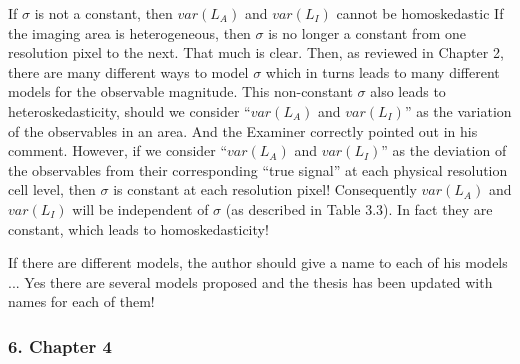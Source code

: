 \replyToComment
    {If $\sigma$ is not a constant, then $var(L_A)$ and $var(L_I)$ cannot be homoskedastic}
    {If the imaging area is heterogeneous, then $\sigma$ is no longer a constant from one resolution pixel to the next.
That much is clear.
Then, as reviewed in Chapter 2, there are many different ways to model $\sigma$ which in turns leads to many different models for the observable magnitude.
This non-constant $\sigma$ also leads to heteroskedasticity, 
  should we consider ``$var(L_A)$ and $var(L_I)$'' as the variation of the observables in an area.
And the Examiner correctly pointed out in his comment. 
However, if we consider ``$var(L_A)$ and $var(L_I)$'' as the deviation of the observables from their corresponding ``true signal'' at each physical resolution cell level, 
  then $\sigma$ is constant at each resolution pixel!
Consequently $var(L_A)$ and $var(L_I)$ will be independent of $\sigma$ (as described in Table 3.3).
In fact they are constant, which leads to homoskedasticity!
}

\replyToComment
    {If there are different models, the author should give a name to each of his models ...}
    {Yes there are several models proposed and the thesis has been updated with names for each of them!}

\subsubsection*{6. Chapter 4}

